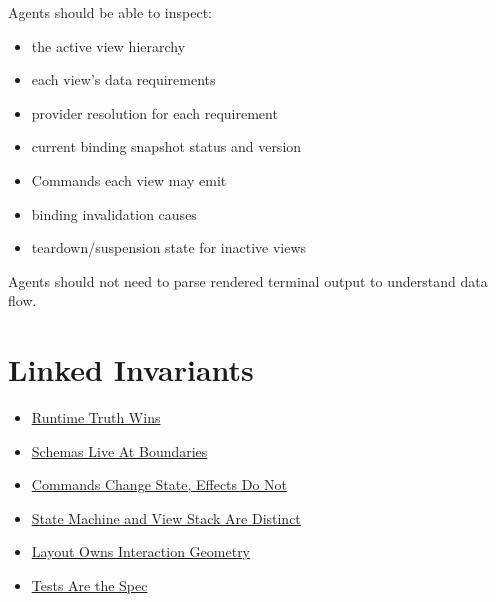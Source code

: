 Agents should be able to inspect:

\begin{itemize}
\tightlist
\item
  the active view hierarchy
\item
  each view's data requirements
\item
  provider resolution for each requirement
\item
  current binding snapshot status and version
\item
  Commands each view may emit
\item
  binding invalidation causes
\item
  teardown/suspension state for inactive views
\end{itemize}

Agents should not need to parse rendered terminal output to understand data flow.

\section{Linked Invariants}\label{record-132-linked-invariants}

\begin{itemize}
\tightlist
\item
  \href{https://github.com/flyingrobots/bijou/blob/cbd70612140e7a450d764b3c7be1c6af878b99bc/docs/invariants/runtime-truth-wins.md}{Runtime Truth Wins}
\item
  \href{https://github.com/flyingrobots/bijou/blob/cbd70612140e7a450d764b3c7be1c6af878b99bc/docs/invariants/schemas-live-at-boundaries.md}{Schemas Live At Boundaries}
\item
  \href{https://github.com/flyingrobots/bijou/blob/cbd70612140e7a450d764b3c7be1c6af878b99bc/docs/invariants/commands-change-state-effects-do-not.md}{Commands Change State, Effects Do Not}
\item
  \href{https://github.com/flyingrobots/bijou/blob/cbd70612140e7a450d764b3c7be1c6af878b99bc/docs/invariants/state-machine-and-view-stack-are-distinct.md}{State Machine and View Stack Are Distinct}
\item
  \href{https://github.com/flyingrobots/bijou/blob/cbd70612140e7a450d764b3c7be1c6af878b99bc/docs/invariants/layout-owns-interaction-geometry.md}{Layout Owns Interaction Geometry}
\item
  \href{https://github.com/flyingrobots/bijou/blob/cbd70612140e7a450d764b3c7be1c6af878b99bc/docs/invariants/tests-are-the-spec.md}{Tests Are the Spec}
\end{itemize}

